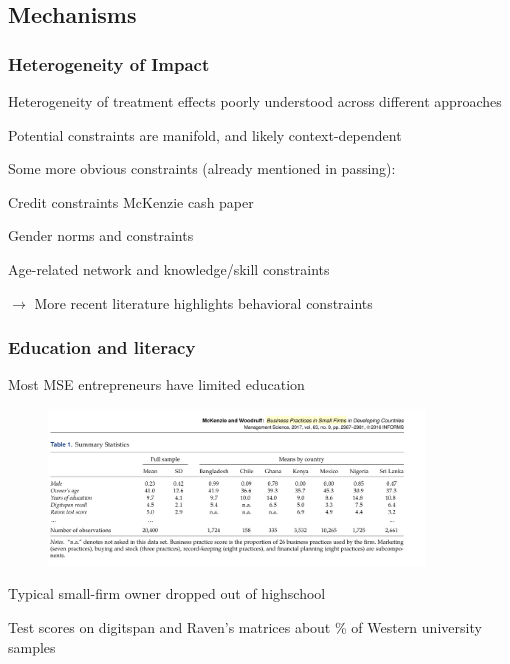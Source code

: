 \documentclass[hideothersubsections, usenames,dvipsnames,11pt]{beamer}
\newenvironment{itemize_2pt}{\itemize\addtolength{\itemsep}{2pt}}{\enditemize}
\begin{document}
\subsection{Mechanisms}

\begin{frame}
\frametitle{Heterogeneity of Impact}

Heterogeneity of treatment effects poorly understood across different approaches
\begin{itemize_2pt}
	\item Potential constraints are manifold, and likely context-dependent
	
\vspace{0.5em}	
	
	\item Some more obvious constraints (already mentioned in passing):
	\begin{itemize_2pt}
		\item \textcolor{bdf}{Credit constraints} \citep[see, e.g.,][]{} McKenzie cash paper
		\item \textcolor{bdf}{Gender norms and constraints}
		\item \textcolor{bdf}{Age-related} network and knowledge/skill \textcolor{bdf}{constraints}
	\end{itemize_2pt} 
\end{itemize_2pt}
	
	\vspace{1.0em}

$\rightarrow$ More recent literature highlights \textcolor{bdf}{behavioral constraints}

\end{frame}

\begin{frame}
\frametitle{Education and literacy}

Most MSE entrepreneurs have limited education

\vspace{-1.9em}

\begin{figure}[htbp]
	\centering
	\includegraphics[width=27em]{pics/McK2017_educ.png}
	\label{McKenzie(2017): Education and cognitive functioning}
\end{figure}

\vspace{-2.5em}

\begin{itemize_2pt}
	\item Typical small-firm owner dropped out of highschool
	\item Test scores on digitspan and Raven's matrices about \% of Western university samples \textcolor{red}{\citep[comp.][]{}}
\end{itemize_2pt}
\end{frame}
\end{document}

